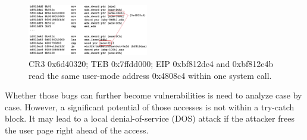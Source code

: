 \begin{figure}[th]
  \includegraphics[width=0.47\textwidth]{figures/doublefetch}
  \centering
  \caption{CR3 0x6d40320; TEB 0x7ffdd000; EIP 0xbf812de4 and 0xbf812e4b read the same user-mode address 0x4808c4 within one system call.}
  \label{fig:doublefetch}
\end{figure}


Whether those bugs can further become vulnerabilities is need to analyze case by case. However, a significant potential of those accesses is not within a try-catch block. It may lead to a local denial-of-service (DOS) attack if the attacker frees the user page right ahead of the access.
